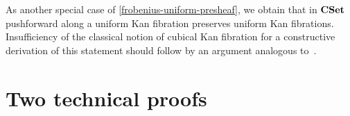 \documentclass[reqno,10pt,a4paper,oneside,draft]{amsart}
\begin{document}
\begin{example}
As another special case of \cref{frobenius-uniform-presheaf}, we obtain that in $\mathbf{CSet}$ pushforward along a uniform Kan fibration preserves uniform Kan fibrations.
Insufficiency of the classical notion of cubical Kan fibration for a constructive derivation of this statement should follow by an argument analogous to~\cite{coquand-non-constructivity-kan}.
\end{example}


\appendix

\section{Two technical proofs}
\label{app:tecp}
\end{document}

